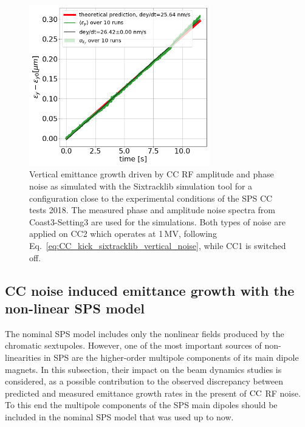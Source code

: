 \begin{figure}[!h]
    \centering         
    \includegraphics[width=0.7\textwidth]{images/Ch6/study_4_AN_PN_sxitracklib.png}
        \caption{Vertical emittance growth driven by CC RF amplitude and phase noise as simulated with the Sixtracklib simulation tool for a configuration close to the experimental conditions of the SPS CC tests 2018. The measured phase and amplitude noise spectra from Coast3-Setting3 are used for the simulations. Both types of noise are applied on CC2 which operates at 1\,MV, following Eq.~\eqref{eq:CC_kick_sixtracklib_vertical_noise}, while CC1 is switched off.}
        \label{fig:study_4_sixtracklib_global_cc_scheme_measured_spectra_AN_and_PN}
\end{figure}


\subsection{CC noise induced emittance growth with the non-linear SPS model}\label{subsec:global_CC_sixtracklib_noiseCoast3_setting3_non_linear_sps}


The nominal SPS model includes only the nonlinear fields produced by the chromatic sextupoles. However, one of the most important sources of non-linearities in SPS are the higher-order multipole components of its main dipole magnets. In this subsection, their impact on the beam dynamics studies is considered, as a possible contribution to the observed discrepancy between predicted and measured emittance growth rates in the present of ${\mathrm{CC}}$ RF noise. To this end the multipole components of the SPS main dipoles should be included in the nominal SPS model that was used up to now.

